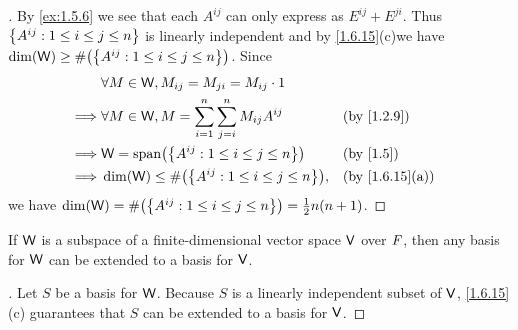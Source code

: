 \begin{proof}[]
  By \cref{ex:1.5.6} we see that each \(A^{i j}\) can only express as \(E^{i j} + E^{j i}\).
  Thus \(\left\lbrace A^{i j} : 1 \leq i \leq j \leq n\right\rbrace\) is linearly independent and by \cref{1.6.15}(c)we have  \(\dim(\W) \geq \#\pa{\set{A^{i j} : 1 \leq i \leq j \leq n}}\).
  Since
  \begin{align*}
             & \forall M \in \W, M_{i j} = M_{j i} = M_{i j} \cdot 1                                                 \\
    \implies & \forall M \in \W, M = \sum_{i = 1}^n \sum_{j = i}^n M_{i j} A^{i j} &  & \text{(by \cref{1.2.9})}     \\
    \implies & \W = \spn{\set{A^{i j} : 1 \leq i \leq j \leq n}}                   &  & \text{(by \cref{1.5})}       \\
    \implies & \dim(\W) \leq \#\pa{\set{A^{i j} : 1 \leq i \leq j \leq n}},        &  & \text{(by \cref{1.6.15}(a))}
  \end{align*}
  we have \(\dim(\W) = \#\pa{\set{A^{i j} : 1 \leq i \leq j \leq n}} = \frac{1}{2} n(n + 1)\).
\end{proof}

\begin{cor}\label{1.6.19}
  If \(\mathsf{W}\) is a subspace of a finite-dimensional vector space \(\mathsf{V}\) over \(\mathit{F}\), then any basis for \(\mathsf{W}\) can be extended to a basis for \(\mathsf{V}\).
\end{cor}

\begin{proof}[]
  Let \(S\) be a basis for \(\mathsf{W}\).
  Because \(S\) is a linearly independent subset of \(\mathsf{V}\), \cref{1.6.15}(c) guarantees that \(S\) can be extended to a basis for \(\mathsf{V}\).
\end{proof}


